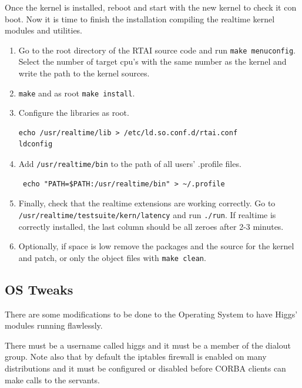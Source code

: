 Once the kernel is installed, reboot and start with the new kernel to check it con boot. Now it is time to
finish the installation compiling the realtime kernel modules and utilities.
\begin{enumerate}
 \item Go to the root directory of the RTAI source code and run \texttt{make menuconfig}. Select the number of
target cpu's with the same number as the kernel and write the path to the kernel sources.
\item \texttt{make} and as root \texttt{make install}.
\item Configure the libraries as root.
\begin{verbatim}
echo /usr/realtime/lib > /etc/ld.so.conf.d/rtai.conf
ldconfig
\end{verbatim} 
\item Add \texttt{/usr/realtime/bin} to the path of all users' .profile files.
\begin{verbatim}
 echo "PATH=$PATH:/usr/realtime/bin" > ~/.profile
\end{verbatim} 
\item Finally, check that the realtime extensions are working correctly. Go to \texttt{/usr/realtime/testsuite/kern/latency}
and run \texttt{./run}. If realtime is correctly installed, the last column should be all zeroes after 2-3 minutes.
\item Optionally, if space is low remove the packages and the source for the kernel and patch, or only the object files
with \texttt{make clean}.
\end{enumerate}


\subsection{OS Tweaks}
There are some modifications to be done to the Operating System to have Higgs' modules running flawlessly.

There must be a username called higgs and it must be a member of the dialout
group. Note also that by default the iptables firewall is enabled on many
distributions and it must be configured or disabled before CORBA clients can make calls to the
servants.

